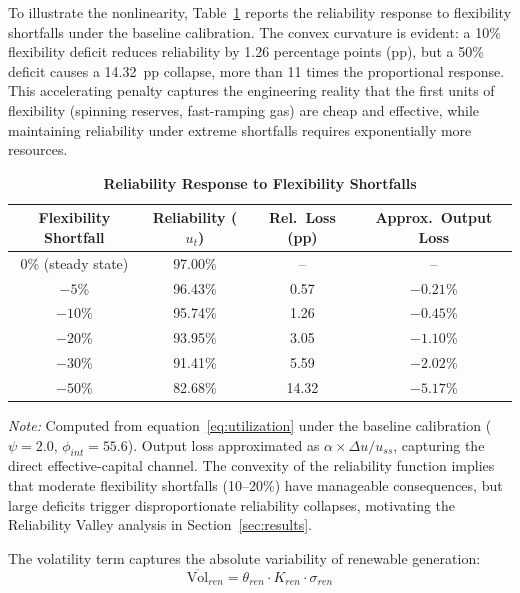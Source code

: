 \documentclass[12pt, a4paper]{article}
\begin{document}
	To illustrate the nonlinearity, Table~\ref{tab:reliability_numerical} reports the reliability response to flexibility shortfalls under the baseline calibration. The convex curvature is evident: a 10\% flexibility deficit reduces reliability by 1.26 percentage points (pp), but a 50\% deficit causes a 14.32~pp collapse, more than 11 times the proportional response. This accelerating penalty captures the engineering reality that the first units of flexibility (spinning reserves, fast-ramping gas) are cheap and effective, while maintaining reliability under extreme shortfalls requires exponentially more resources.
	
	\begin{table}[H]
		\centering
		\caption{\textbf{Reliability Response to Flexibility Shortfalls}}
		\label{tab:reliability_numerical}
		\renewcommand{\arraystretch}{1.3}
		\small
		\begin{tabular}{c c c c}
			\toprule
			\textbf{Flexibility Shortfall} & \textbf{Reliability ($u_t$)} & \textbf{Rel.\ Loss (pp)} & \textbf{Approx.\ Output Loss} \\
			\midrule
			0\% (steady state) & 97.00\% & -- & -- \\
			$-5$\% & 96.43\% & 0.57 & $-0.21$\% \\
			$-10$\% & 95.74\% & 1.26 & $-0.45$\% \\
			$-20$\% & 93.95\% & 3.05 & $-1.10$\% \\
			$-30$\% & 91.41\% & 5.59 & $-2.02$\% \\
			$-50$\% & 82.68\% & 14.32 & $-5.17$\% \\
			\bottomrule
		\end{tabular}
		\parbox{\linewidth}{\footnotesize \textit{Note:} Computed from equation~\eqref{eq:utilization} under the baseline calibration ($\psi = 2.0$, $\phi_{int} = 55.6$). Output loss approximated as $\alpha \times \Delta u / u_{ss}$, capturing the direct effective-capital channel. The convexity of the reliability function implies that moderate flexibility shortfalls (10--20\%) have manageable consequences, but large deficits trigger disproportionate reliability collapses, motivating the Reliability Valley analysis in Section~\ref{sec:results}.}
	\end{table}
	
	The volatility term captures the absolute variability of renewable generation:
	\begin{equation}
		\overline{\text{Vol}}_{ren} = \theta_{ren} \cdot K_{ren} \cdot \sigma_{ren}
		\label{eq:renewable_volatility}
	\end{equation}
	
\end{document}
